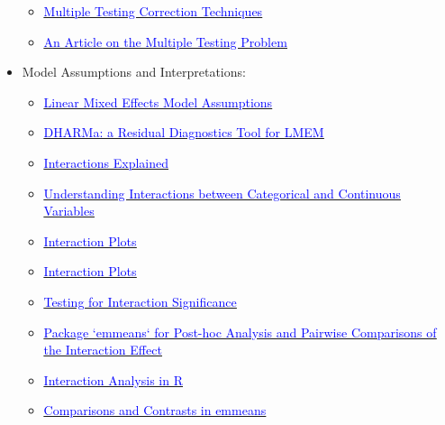 \documentclass[
]{article}
\providecommand{\tightlist}{%
  \setlength{\itemsep}{0pt}\setlength{\parskip}{0pt}}
\begin{document}
\begin{itemize}
  \begin{itemize}
  \tightlist
  \item
    \href{https://www.stat.berkeley.edu/~mgoldman/Section0402.pdf}{\underline{\textcolor{blue}{Multiple Testing Correction Techniques}}}
  \item
    \href{https://egap.org/resource/10-things-to-know-about-multiple-comparisons/}{\underline{\textcolor{blue}{An Article on the Multiple Testing Problem}}}
  \end{itemize}
\item
  Model Assumptions and Interpretations:

  \begin{itemize}
  \tightlist
  \item
    \href{https://besjournals.onlinelibrary.wiley.com/doi/10.1111/2041-210X.13434}{\underline{\textcolor{blue}{Linear Mixed Effects Model Assumptions}}}
  \item
    \href{https://cran.r-project.org/web/packages/DHARMa/vignettes/DHARMa.html}{\underline{\textcolor{blue}{DHARMa: a Residual Diagnostics Tool for LMEM}}}
  \item
    \href{www.medicine.mcgill.ca/epidemiology/Joseph/courses/EPIB-621/interaction.pdf}{\underline{\textcolor{blue}{Interactions Explained}}}
  \item
    \href{https://www.theanalysisfactor.com/interactions-categorical-and-continuous-variables/}{\underline{\textcolor{blue}{Understanding Interactions between Categorical and Continuous Variables}}}
  \item
    \href{https://ademos.people.uic.edu/Chapter13.html}{\underline{\textcolor{blue}{Interaction Plots}}}
  \item
    \href{https://rpubs.com/tf_peterson/interactionplotDemo}{\underline{\textcolor{blue}{Interaction Plots}}}
  \item
    \href{https://mcfromnz.wordpress.com/2011/03/02/anova-type-iiiiii-ss-explained/}{\underline{\textcolor{blue}{Testing for Interaction Significance}}}
  \item
    \href{https://cran.r-project.org/web/packages/emmeans/vignettes/interactions.html}{\underline{\textcolor{blue}{Package `emmeans` for Post-hoc Analysis and Pairwise Comparisons of the Interaction Effect}}}
  \item
    \href{https://stats.oarc.ucla.edu/r/seminars/interactions-r/}{\underline{\textcolor{blue}{Interaction Analysis in R}}}
  \item
    \href{https://cran.r-project.org/web/packages/emmeans/vignettes/comparisons.html}{\underline{\textcolor{blue}{Comparisons and Contrasts in emmeans}}}
  \end{itemize}
\end{itemize}
\end{document}

